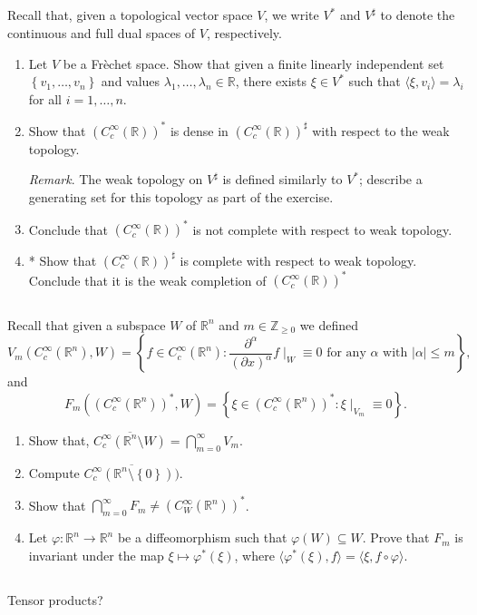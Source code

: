 \documentclass[11pt, reqno,a4paper, twoside]{amsproc}
\newcommand{\dbZ}{\mathbb Z}
\newcommand{\dbR}{\mathbb R}
\newcommand{\gen}[1]{\langle{#1}\rangle}
\newcommand{\set}[1]{\left\{{#1}\right\}}
\newcommand{\abs}[1]{\left|#1\right|}
\newcommand{\widebar}{\overline}
\begin{document}
\subsection{}
	Recall that, given a topological vector space $V$, we write $V^*$ and $V^\sharp$ to denote the continuous and full dual spaces of $V$, respectively. 
	\begin{enumerate}
		\item Let $V$ be a Fr\`echet space. Show that given a finite linearly independent set $\set{v_1,\ldots,v_n}$ and values $\lambda_1,\ldots,\lambda_n\in\dbR$, there exists $\xi\in V^*$ such that $\gen{\xi,v_i}=\lambda_i$ for all $i=1,\ldots,n$. 
		\item Show that $(C_c^\infty(\dbR))^*$ is dense in $(C_c^\infty(\dbR))^\sharp$ with respect to the weak topology.
		
		\textit{Remark}. The weak topology on $V^\sharp$ is defined similarly to $V^*$; describe a generating set for this topology as part of the exercise.
		
		\item  Conclude that $(C_c^\infty(\dbR))^*$ is not complete with respect to weak topology.
		
		\item  * Show that $(C_c^\infty(\dbR))^\sharp$ is complete with respect to weak topology. Conclude that it is the weak completion of $(C_c^\infty(\dbR))^*$
	\end{enumerate}

\subsection{} Recall that given a subspace $W$ of $\dbR^n$ and $m\in\dbZ_{\ge 0}$ we defined
\[V_m(C_c^\infty(\dbR^n),W)=\set{f\in C_c^\infty(\dbR^n):\frac{\partial^\alpha}{(\partial x)^\alpha}f\mid_W\equiv 0\text{ for any $\alpha$ with }\abs{\alpha}\le m},\]
and 
\[F_m((C_c^\infty(\dbR^n))^*,W)=\set{\xi\in (C_c^\infty(\dbR^n))^*:\xi\mid_{V_m}\equiv 0}.\]
\begin{enumerate}
	\item Show that, $\widebar{C_c^\infty(\dbR^n\setminus W)}=\bigcap_{m=0}^\infty V_m$. 
	\item Compute $\widebar{C_c^\infty(\dbR^n\setminus\set{0}))}$. 
	\item Show that $\bigcap_{m=0}^\infty F_m\ne (C_{W}^\infty(\dbR^n))^*$.
	\item Let $\varphi:\dbR^n\to\dbR^n$ be a diffeomorphism such that $\varphi(W)\subseteq W$. Prove that $F_m$ is invariant under the map $\xi\mapsto\varphi^*(\xi)$, where $\gen{\varphi^*(\xi),f}=\gen{\xi,f\circ\varphi}$. 
\end{enumerate}

\subsection{}Tensor products?
\end{document}
